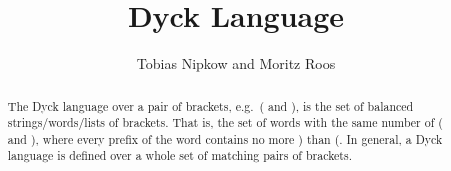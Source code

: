 \documentclass[11pt,a4paper]{article}
\begin{document}
\title{Dyck Language}
\author{Tobias Nipkow and Moritz Roos}
\maketitle

\begin{abstract}
The Dyck language over a pair of brackets, e.g.\ ( and ), is the set
of balanced strings/words/lists of brackets. That is, the set of words
with the same number of ( and ), where every prefix of the word
contains no more ) than (. In general, a Dyck language is defined over
a whole set of matching pairs of brackets.
\end{abstract}

\tableofcontents





\end{document}

